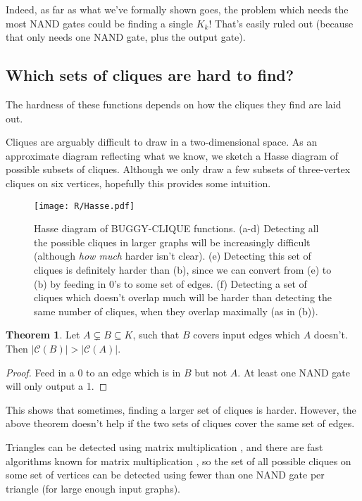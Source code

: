 \documentclass[12pt]{article}
\theoremstyle{definition}
\newtheorem{thm}{Theorem}[section]
\newcommand{\bigC}[0]{\mathcal{C}}
\begin{document}
Indeed, as far as what we've formally shown goes, the problem which needs
the most NAND gates could be finding a single $K_k$! That's easily ruled out
(because that only needs one NAND gate, plus the output gate).

\subsection{Which sets of cliques are hard to find?}
\label{sec:whichCliques}

The hardness of these functions depends
on how the cliques they find are laid out.

Cliques are arguably difficult to draw in a two-dimensional space.
As an approximate diagram reflecting what we know,
we sketch a Hasse diagram of possible subsets of cliques. Although
we only draw a few subsets of three-vertex cliques
on six vertices, hopefully this provides some
intuition.

\begin{figure}
\centering
\texttt{[image: R/Hasse.pdf]}
\caption{Hasse diagram of BUGGY-CLIQUE functions.
(a-d) 
Detecting all the possible cliques in larger graphs will be
increasingly difficult (although {\em how much} harder isn't clear).
(e) 
Detecting this set of cliques is definitely harder than (b),
since we can convert from (e) to (b) by feeding in 0's to
some set of edges.
(f) Detecting a set of cliques which doesn't overlap much will be
harder than detecting the same number of cliques, when they overlap
maximally (as in (b)).}
\label{fig:Hasse}
\end{figure}


\begin{thm}
\label{edgeZonking}
Let $A \subsetneq B \subseteq K$, such that $B$ covers input edges
which $A$ doesn't. Then $|\bigC(B)| > |\bigC(A)|$.
\end{thm}
\begin{proof}
Feed in a 0 to an edge which is in $B$ but not $A$. At least one
NAND gate will only output a 1.
\end{proof}

This shows that sometimes, finding a larger set of cliques is
harder. However, the above theorem doesn't help if the two
sets of cliques cover the same set of edges.

Triangles can be detected using matrix multiplication \cite{itai_finding_1977},
and there are fast algorithms known for matrix multiplication
\cite{strassen_gaussian_1969}
\cite{williams_multiplying_2012}, so the set of all possible
cliques on some set of vertices
 can be detected
using fewer than one NAND gate per triangle (for large enough input graphs).
\end{document}
